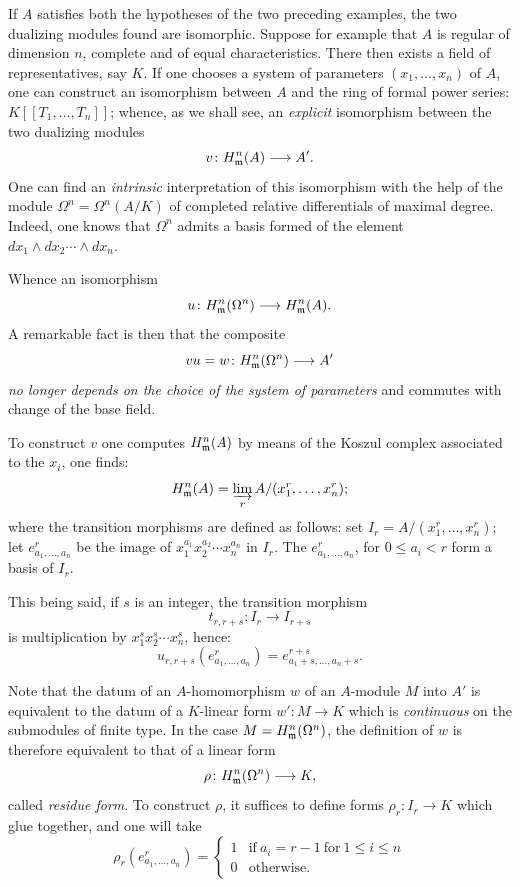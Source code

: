 \begin{remark} \label{IV.5.5}
If $A$ satisfies both the hypotheses of the two preceding examples, the two dualizing modules found are isomorphic. Suppose for example that $A$ is regular of dimension $n$, complete and of equal characteristics. There then exists a field of representatives, say $K$. If one chooses a system of parameters $(x_{1}, \ldots, x_{n})$ of $A$, one can construct an isomorphism between $A$ and the ring of formal power series: $K[[T_{1}, \ldots, T_{n}]]$; whence, as we shall see, an \emph{explicit} isomorphism between the two dualizing modules
$$
v\colon {H^n_\m}(A)\to A'.
$$
One can find an \emph{intrinsic} interpretation of this isomorphism with the help of the module $\Omega^n=\Omega^{n}(A/K)$ of completed relative differentials of maximal degree. Indeed, one knows that $\Omega^n$ admits a basis formed of the element $dx_{1}\wedge dx_{2}\cdots \wedge dx_{n}$.

Whence an isomorphism
$$
u\colon {H^n_\m}(\Omega^n)\to {H^n_\m}(A).
$$
A remarkable fact is then that the composite
$$
vu=w\colon {H^n_\m}(\Omega^{n})\to A'
$$
\emph{no longer depends on the choice of the system of parameters} and commutes with change of the base field.

To construct $v$ one computes ${H^n_{\mathfrak{m}}}(A)$ by means of the Koszul complex associated to the $x_{i}$, one finds:
$$
{H^n_{\mathfrak{m}}}(A)=\varinjlim_{r}A/(x_{1}^{r}, \ldots, x_{n}^{r});
$$
where the transition morphisms are defined as follows: set $I_{r}=A/(x_{1}^{r}, \ldots, x_{n}^{r})$; let $e_{a_{1}, \ldots, a_{n}}^{r}$ be the image of $x_{1}^{a_{1}}x_{2}^{a_{2}}\cdots x_{n}^{a_{n}}$ in $I_{r}$. The $e_{a_{1}, \ldots, a_{n}}^{r}$, for $0\leq a_{i}<r$ form a basis of $I_{r}$.

This being said, if $s$ is an integer, the transition morphism
$$
t_{r, r+s}\colon I_{r}\to I_{r+s}
$$
is multiplication by $x_{1}^{s}x_{2}^{s}\cdots x_{n}^{s}$, hence:
$$
u_{r, r+s}(e_{a_{1}, \ldots, a_{n}}^{r})=e_{a_{1}+s, \ldots, a_{n}+s}^{r+s}.
$$

Note that the datum of an $A$-homomorphism $w$ of an $A$-module $M$ into $A'$ is equivalent to the datum of a $K$-linear form $w':M\to K$ which is \emph{continuous} on the submodules of finite type. In the case $M={H^n_{\mathfrak{m}}}(\Omega^{n})$, the definition of $w$ is therefore equivalent to that of a linear form
$$
\rho \colon {H^n_\m}(\Omega^{n})\to K,
$$
called \emph{residue form}\label{pagecithar}. To construct $\rho$, it suffices to define forms $\rho_{r}:I_{r}\to K$ which glue together, and one will take
$$
\rho_{r}(e_{a_{1}, \ldots, a_{n}}^{r})=
\begin{cases}
1&\text{if}\ a_{i}=r-1\ \text{for}\ 1\leq i\leq n\\
0& \text{otherwise.}
\end{cases}
$$
\end{remark}
